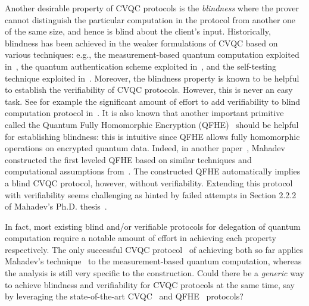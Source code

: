 Another desirable property of CVQC protocols is the \emph{blindness} where the prover cannot distinguish the particular computation in the protocol from another one of the same size, and hence is blind about the client's input.
Historically, blindness has been achieved in the weaker formulations of CVQC based on various techniques: e.g., the measurement-based quantum computation exploited in~\cite{BFK09}, the quantum authentication scheme exploited in~\cite{arXiv:ABOEM17}, and the self-testing technique exploited in~\cite{Nat:RUV13}.
Moreover, the blindness property is known to be helpful to establish the verifiability of CVQC protocols. However, this is never an easy task.
See for example the significant amount of effort to add verifiability to blind computation protocol in~\cite{FK17}.
It is also known that another important primitive called the Quantum Fully Homomorphic Encryption (QFHE)~\cite{BJ15, DSS16, LC18, NS18, OTF18, mahadev_qfhe} should be helpful for establishing blindness: this is intuitive since QFHE allows fully homomorphic operations on encrypted quantum data. 
Indeed, in another paper~\cite{mahadev_qfhe}, Mahadev constructed the first leveled QFHE based on similar techniques and computational assumptions from~\cite{FOCS:Mahadev18a}.
The constructed QFHE automatically implies a blind CVQC protocol, however, without verifiability.
Extending this protocol with verifiability seems challenging as hinted by failed attempts in Section 2.2.2 of Mahadev's Ph.D. thesis~\cite{mahadev_2018}.

In fact, most existing blind and/or verifiable protocols for delegation of quantum computation require a notable amount of effort in achieving each property respectively. 
The only successful CVQC protocol~\cite{FOCS:GheVid19} of achieving both so far applies Mahadev's technique~\cite{FOCS:Mahadev18a} to the measurement-based quantum computation, whereas the analysis is still very specific to the construction.
Could there be a \emph{generic} way to achieve blindness and verifiability for CVQC protocols at the same time, say by leveraging the state-of-the-art CVQC~\cite{FOCS:Mahadev18a} and QFHE~\cite{mahadev_qfhe} protocols? 


